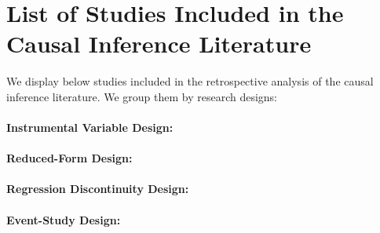 \documentclass[12pt]{article}
\begin{document}
\singlespacing
\setlength\bibsep{0pt}


\onehalfspacing

\pagebreak


\appendix

\section{List of Studies Included in the Causal Inference Literature} \label{causal_lit}
\setcounter{figure}{0}
\renewcommand\thefigure{\thesection.\arabic{figure}}   


We display below studies included in the retrospective analysis of the causal inference literature. We group them by research designs:

\singlespacing
\paragraph{Instrumental Variable Design:} \cite{moretti_pollution_2011, ebenstein_particulate_2015, schwartz_estimating_2015, arceo_does_2016, he_effect_2016, knittel_caution_2016, schlenker_airports_2016, sheldon_impact_2017, schwartz_estimating_2017, zhong_traffic_2017, barwick_morbidity_2018, hanlon2018london, schwartz_national_2018, halliday_vog_2019, deryugina_mortality_2019, cheung_mitigating_2020, fan_impact_2020, he_straw_2020, giaccherini_when_2021, godzinski_disentangling_2021, guidetti_placebo_2021, kim_air_2021, liu_effect_2021, xia_short-term_2022}

\paragraph{Reduced-Form Design:} \cite{bauernschuster_when_2017, jans_economic_2018, jia_is_2019, godzinski2019short}

\begin{sloppypar}
\paragraph{Regression Discontinuity Design:} \cite{chen_air_2018, fan_winter_2020, anderson2022bounds}


\paragraph{Event-Study Design:} \cite{mullins_effects_2015, simeonova_congestion_2021}
\end{sloppypar}
\end{document}
